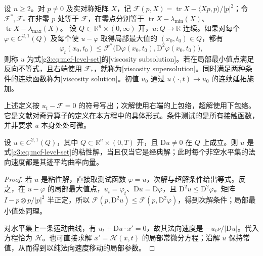 \begin{definition}\label{g3:def:mcf-viscosity-solution}
	设 \(n\ge2\)。对 \(p\ne0\) 及实对称矩阵 \(X\)，记 \(\mathcal F(p,X)=\operatorname{tr}X-\langle Xp,p\rangle/|p|^2\)；令 \(\mathcal F^*,\mathcal F_*\) 在非零 \(p\) 处等于 \(\mathcal F\)，在零点分别等于 \(\operatorname{tr}X-\lambda_{\min}(X)\)、\(\operatorname{tr}X-\lambda_{\max}(X)\)。
	设 \(Q\subset\mathbb R^n\times(0,\infty)\) 开，\(u:Q\to\mathbb R\) 连续。如果对每个 \(\varphi\in C^{2,1}(Q)\) 及每个使 \(u-\varphi\) 取得局部最大值的 \((x_0,t_0)\in Q\)，都有
	\[
	\varphi_t(x_0,t_0)
	\le\mathcal F^*\bigl(\mathrm D\varphi(x_0,t_0),\mathrm D^2\varphi(x_0,t_0)\bigr),
	\]
	则称 \(u\) 为式\eqref{g3:eq:mcf-level-set}的[viscosity subsolution]。若在局部最小值点满足反向不等式，且右端使用 \(\mathcal F_*\)，就称为[viscosity supersolution]。同时满足两种条件的连续函数称为[viscosity solution]。初值 \(u_0\) 通过 \(u(\cdot,t)\to u_0\) 的连续延拓施加。
\end{definition}

上述定义按 \(u_t-\mathcal F=0\) 的符号写出；次解使用右端的上包络，超解使用下包络。它是文献\cite[定义2.1，第753--754页]{ChenGigaGoto1991MeanCurvature}对奇异算子的定义在本方程中的具体形式。条件测试的是所有接触函数，并非要求 \(u\) 本身处处可微。

\begin{proposition}\label{g3:prop:mcf-level-set-smooth-consistency}
	设 \(u\in C^{2,1}(Q)\)，其中 \(Q\subset\mathbb R^n\times(0,T)\) 开，且 \(\mathrm Du\ne0\) 在 \(Q\) 上成立。则 \(u\) 是式\eqref{g3:eq:mcf-level-set}的粘性解，当且仅当它是经典解；此时每个非空水平集的法向速度都是其迹平均曲率向量。
\end{proposition}
\begin{proof}
	若 \(u\) 是粘性解，直接取测试函数 \(\varphi=u\)，次解与超解条件给出等式。反之，在 \(u-\varphi\) 的局部最大值点，\(u_t=\varphi_t\)、\(\mathrm Du=\mathrm D\varphi\)，且 \(\mathrm D^2u\le\mathrm D^2\varphi\)。矩阵 \(I-p\otimes p/|p|^2\) 半正定，所以 \(\mathcal F(p,\mathrm D^2u)\le\mathcal F(p,\mathrm D^2\varphi)\)，得到次解条件；局部最小值处同理。

	对水平集上一条运动曲线，有 \(u_t+\mathrm Du\cdot x'=0\)，故其法向速度是 \(-u_t\nu/|\mathrm Du|\)。代入方程恰为 \(\mathcal H\)。也可直接求解 \(x'=\mathcal H(x,t)\) 的局部常微分方程；沿解 \(u\) 保持常值，从而得到以纯法向速度移动的局部参数。
\end{proof}

